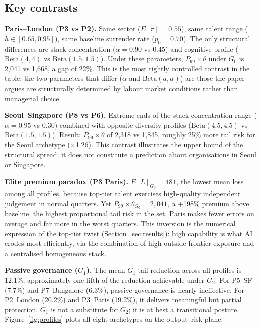 \documentclass[11pt,a4paper]{article}
\begin{document}
\begin{appendices}
\subsection{Key contrasts}\label{app:abl:contrasts}

\textbf{Paris--London (P3 vs P2).}
Same sector ($E[\pi] = 0.55$), same talent range
($h \in [0.65, 0.95]$), same baseline surrender rate ($p_0 = 0.70$). The
only structural differences are stack concentration ($\alpha = 0.90$ vs
$0.45$) and cognitive profile ($\mathrm{Beta}(4,4)$ vs
$\mathrm{Beta}(1.5,1.5)$). Under these parameters, $P_{99}\times\theta$
under $G_0$ is 2,041 vs 1,668, a gap of 22\%. This is the most tightly
controlled contrast in the table: the two parameters that differ ($\alpha$
and $\mathrm{Beta}(a,a)$) are those the paper argues are structurally
determined by labour market conditions rather than managerial choice.

\textbf{Seoul--Singapore (P8 vs P6).}
Extreme ends of the stack concentration range ($\alpha = 0.95$ vs $0.30$)
combined with opposite diversity profiles ($\mathrm{Beta}(4.5,4.5)$ vs
$\mathrm{Beta}(1.5,1.5)$). Result: $P_{99}\times\theta$ of 2,318 vs
1,845, roughly 25\% more tail risk for the Seoul archetype ($\times$1.26).
This contrast illustrates the upper bound of the structural spread; it does
not constitute a prediction about organisations in Seoul or Singapore.

\textbf{Elite premium paradox (P3 Paris).}
$E[L]_{G_0} = 481$, the lowest mean loss among all profiles, because
top-tier talent exercises high-quality independent judgement in normal
quarters. Yet $P_{99}\times\theta_{G_0} = 2{,}041$, a +198\% premium above
baseline, the highest proportional tail risk in the set. Paris makes fewer
errors on average and far more in the worst quarters. This inversion is the
numerical expression of the top-tier twist (Section~\ref{sec:results}): high
capability is what AI erodes most efficiently, via the combination of high
outside-frontier exposure and a centralised homogeneous stack.

\textbf{Passive governance ($G_1$).}
The mean $G_1$ tail reduction across all profiles is 12.1\%, approximately
one-fifth of the reduction achievable under $G_2$. For P5~SF (7.7\%) and
P7~Bangalore (6.3\%), passive governance is nearly ineffective. For
P2~London (20.2\%) and P3~Paris (19.2\%), it delivers meaningful but partial
protection. $G_1$ is not a substitute for $G_2$; it is at best a
transitional posture. Figure~\ref{fig:profiles} plots all eight archetypes
on the output--risk plane.


\end{appendices}
\end{document}
